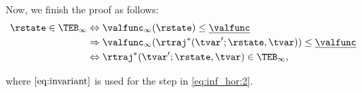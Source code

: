 \begin{IEEEproof}
  Now, we finish the proof as follows:
  \begin{subequations} \label{eq:inf_hor}
    \begin{align}
    \rstate \in \TEB_\infty &\Leftrightarrow \valfunc_\infty(\rstate) \le \underline\valfunc \\
    & \Rightarrow \valfunc_\infty(\rtraj^*(\tvar'; \rstate, \tvar)) \le \underline\valfunc \label{eq:inf_hor:2}\\
    & \Leftrightarrow \rtraj^*(\tvar'; \rstate, \tvar) \in \TEB_\infty,
    \end{align}
  \end{subequations}
  
  \noindent where $\eqref{eq:invariant}$ is used for the step in \eqref{eq:inf_hor:2}.
  
\end{IEEEproof} 